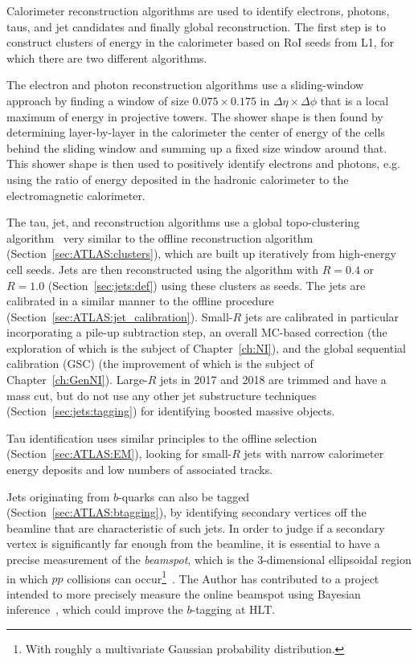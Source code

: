 Calorimeter reconstruction algorithms are used to identify electrons, photons, taus, and jet candidates and finally \etmiss{} global reconstruction.
The first step is to construct clusters of energy in the calorimeter based on RoI seeds from L1, for which there are two different algorithms.

The electron and photon reconstruction algorithms use a sliding-window approach by finding a window of size $0.075 \times 0.175$ in $\Delta\eta \times \Delta\phi$ that is a local maximum of energy in projective towers.
The shower shape is then found by determining layer-by-layer in the calorimeter the center of energy of the cells behind the sliding window and summing up a fixed size window around that.
This shower shape is then used to positively identify electrons and photons, e.g. using the ratio of energy deposited in the hadronic calorimeter to the electromagnetic calorimeter.

The tau, jet, and \etmiss{} reconstruction algorithms use a global topo-clustering algorithm~\cite{Aad:2016upy} very similar to the offline reconstruction algorithm (Section~\ref{sec:ATLAS:clusters}), which are built up iteratively from high-energy cell seeds.
Jets are then reconstructed using the \antikt{} algorithm with $R=0.4$ or $R=1.0$ (Section~\ref{sec:jets:def}) using these clusters as seeds.
The jets are calibrated in a similar manner to the offline procedure (Section~\ref{sec:ATLAS:jet_calibration}).
Small-$R$ jets are calibrated in particular incorporating a pile-up subtraction step, an overall MC-based \pt{} correction (the exploration of which is the subject of Chapter~\ref{ch:NI}), and the global sequential calibration (GSC) (the improvement of which is the subject of Chapter~\ref{ch:GenNI}).
Large-$R$ jets in 2017 and 2018 are trimmed and have a mass cut, but do not use any other jet substructure techniques (Section~\ref{sec:jets:tagging}) for identifying boosted massive objects.

Tau identification uses similar principles to the offline selection (Section~\ref{sec:ATLAS:EM}), looking for small-$R$ jets with narrow calorimeter energy deposits and low numbers of associated tracks.

Jets originating from $b$-quarks can also be tagged (Section~\ref{sec:ATLAS:btagging}), by identifying secondary vertices off the beamline that are characteristic of such jets.
In order to judge if a secondary vertex is significantly far enough from the beamline, it is essential to have a precise measurement of the \textit{beamspot}, which is the 3-dimensional ellipsoidal region in which $pp$ collisions can occur\footnote{With roughly a multivariate Gaussian probability distribution.}~\cite{ATLAS-CONF-2010-027}.
The Author has contributed to a project intended to more precisely measure the online beamspot using Bayesian inference~\cite{beamspot}, which could improve the $b$-tagging at HLT.


